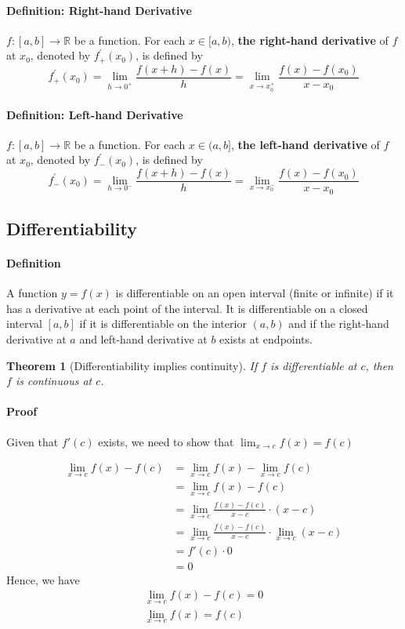 \documentclass[12pt]{article}
\newtheorem{theorem}{Theorem}
\begin{document}
\paragraph{Definition: Right-hand Derivative}
$f : [a, b] \to \mathbb{R}$ be a function.  For each $x \in [a, b)$, \textbf{the right-hand derivative} of $f$ at $x_0$, 
denoted by $f^{'}_{+}(x_0)$, is defined by
\[
    f^{'}_{+}(x_0) = \lim_{h \to 0^{+}} \frac{f(x + h) - f(x)}{h} = \lim_{x \to x_0^{+}} \frac{f(x) - f(x_0)}{x - x_0} 
\]

\paragraph{Definition: Left-hand Derivative}
$f : [a, b] \to \mathbb{R}$ be a function.  For each $x \in (a, b]$, \textbf{the left-hand derivative} of $f$ at $x_0$, 
denoted by $f^{'}_{-}(x_0)$, is defined by
\[
    f^{'}_{-}(x_0) = \lim_{h \to 0^{-}} \frac{f(x + h) - f(x)}{h} = \lim_{x \to x_0^{-}} \frac{f(x) - f(x_0)}{x - x_0} 
\]

\subsection{Differentiability}
\paragraph{Definition}
A function $y = f(x)$ is differentiable on an open interval (finite or infinite) if it has a
derivative at each point of the interval. It is differentiable on a closed interval $[a, b]$ if it
is differentiable on the interior $(a, b)$ and if the right-hand derivative at $a$ and left-hand derivative at $b$ exists at endpoints.

\begin{theorem}[Differentiability implies continuity]
    If $f$ is differentiable at $c$, then $f$ is continuous at $c$.
\end{theorem}

\paragraph{Proof} Given that $f'(c)$ exists, we need to show that $\lim_{x \to c} f(x) = f(c)$ 

\begin{align*} 
    \lim_{x \to c} f(x) - f(c) &= \lim_{x \to c} f(x) - \lim_{x \to c} f(c) \\
    &= \lim_{x \to c} f(x) - f(c) \\
    &= \lim_{x \to c} \frac{f(x) - f(c)}{x - c} \cdot (x - c) \\
    &= \lim_{x \to c} \frac{f(x) - f(c)}{x - c} \cdot \lim_{x \to c} (x - c) \\
    &= f'(c) \cdot 0 \\
    &= 0
\end{align*}
Hence, we have
\begin{align*} 
    \lim_{x \to c} f(x) - f(c) = 0 \\
    \lim_{x \to c} f(x) = f(c)
\end{align*}
\end{document}
